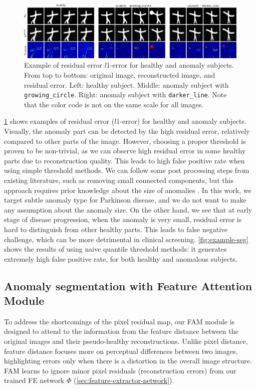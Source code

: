 \begin{figure}
    \centering
    \includegraphics[width=1\linewidth]{figures/ex-recon-error.pdf}
    \caption[Example of $l1$-error for healthy and anomalous subjects]{Example of residual error $l1$-error for healthy and anomaly subjects. From top to bottom: original image, reconstructed image, and residual error. Left: healthy subject. Middle: anomaly subject with \texttt{growing\_circle}. Right: anomaly subject with \texttt{darker\_line}. Note that the color code is not on the same scale for all images.}
    \label{fig:example-recon-error}
\end{figure}

\cref{fig:example-recon-error} shows examples of residual error ($l1$-error) for healthy and anomaly subjects. Visually, the anomaly part can be detected by the high residual error, relatively compared to other parts of the image. However, choosing a proper threshold is proven to be non-trivial, as we can observe high residual error in some healthy parts due to reconstruction quality. This leads to high false positive rate when using simple threshold methods. We can follow some post processing steps from existing literature, such as removing small connected components, but this approach requires prior knowledge about the size of anomalies \cite{behrendt2025cDDPM}. In this work, we target subtle anomaly type for Parkinson disease, and we do not want to make any assumption about the anomaly size. On the other hand, we see that at early stage of disease progression, when the anomaly is very small, residual error is hard to distinguish from other healthy parts. This leads to false negative challenge, which can be more detrimental in clinical screening. \cref{fig:example-seg} shows the results of using naive quantile threshold methods: it generates extremely high false positive rate, for both healthy and anomalous subjects. 

\subsection{Anomaly segmentation with Feature Attention Module}

To address the shortcomings of the pixel residual map, our \ac{FAM} module is designed to attend to the information from the feature distance between the original images and their pseudo-healthy reconstructions. Unlike pixel distance, feature distance focuses more on perceptual differences between two images, highlighting errors only when there is a distortion in the overall image structure. \ac{FAM} learns to ignore minor pixel residuals (reconstruction errors) from our trained FE network $\Phi$ (\cref{sec:feature-extractor-network}). 


